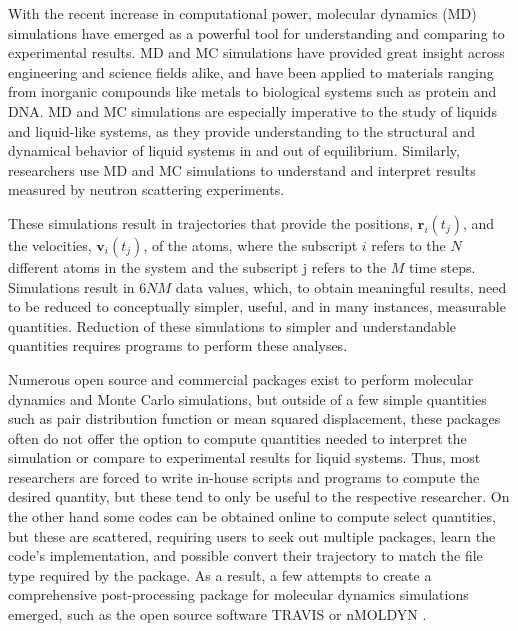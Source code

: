 \label{LiquidLib}

With the recent increase in computational power, molecular dynamics (MD) simulations have emerged as a powerful tool for understanding and comparing to experimental results. MD and MC simulations have provided great insight across engineering and science fields alike, and have been applied to materials ranging from inorganic compounds like metals to biological systems such as protein and DNA. MD and MC simulations are especially imperative to the study of liquids and liquid-like systems, as they provide understanding to the structural and dynamical behavior of liquid systems in and out of equilibrium.  Similarly, researchers use MD and MC simulations to understand and interpret results measured by neutron scattering experiments.

These simulations result in trajectories that provide the positions, $\mathbf{r}_i(t_j)$, and the velocities, $\mathbf{v}_i(t_j)$, of the atoms, where the subscript $i$ refers to the $N$ different atoms in the system and the subscript j refers to the $M$ time steps. Simulations result in $6NM$ data values, which, to obtain meaningful results, need to be reduced to conceptually simpler, useful, and in many instances, measurable quantities. Reduction of these simulations to simpler and understandable quantities requires programs to perform these analyses.

Numerous open source and commercial packages exist to perform molecular dynamics and Monte Carlo simulations, but outside of a few simple quantities such as pair distribution function or mean squared displacement, these packages often do not offer the option to compute quantities needed to interpret the simulation or compare to experimental results for liquid systems. Thus, most researchers are forced to write in-house scripts and programs to compute the desired quantity, but these tend to only be useful to the respective researcher. On the other hand some codes can be obtained online to compute select quantities, but these are scattered, requiring users to seek out multiple packages, learn the code's implementation, and possible convert their trajectory to match the file type required by the package. As a result, a few attempts to create a comprehensive post-processing package for molecular dynamics simulations emerged, such as the open source software TRAVIS \cite{TRAVIS} or nMOLDYN \cite{nMOLDYN}. 

